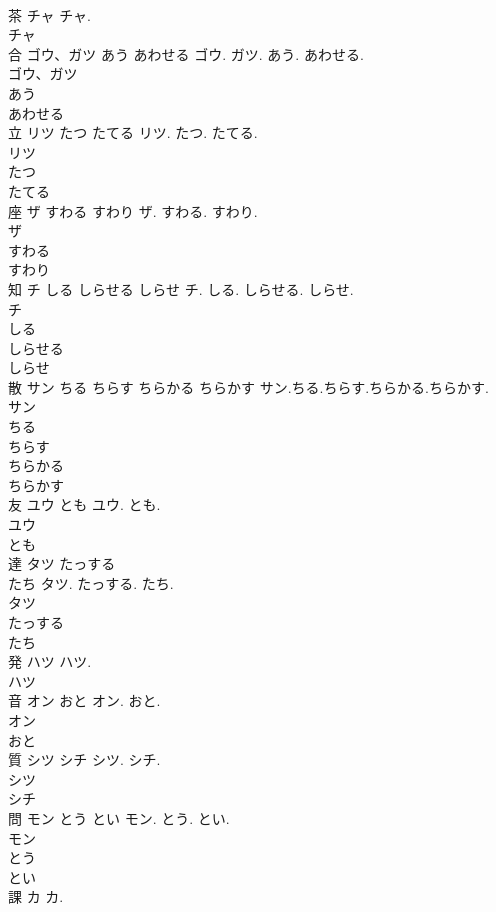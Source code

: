 \documentclass[8pt]{extreport}
\begin{document}
\begin{CJK}{UTF8}{min}
\\	茶	チャ	チャ.	
\\	チャ
\\	合	ゴウ、ガツ あう あわせる	ゴウ. ガツ. あう. あわせる.	
\\	ゴウ、ガツ
\\	あう
\\	あわせる
\\	立	リツ たつ たてる	リツ. たつ. たてる.	
\\	リツ
\\	たつ
\\	たてる
\\	座	ザ すわる すわり	ザ. すわる. すわり.	
\\	ザ
\\	すわる
\\	すわり
\\	知	チ しる しらせる しらせ	チ. しる. しらせる. しらせ.	
\\	チ
\\	しる
\\	しらせる
\\	しらせ
\\	散	サン ちる ちらす ちらかる ちらかす	サン.ちる.ちらす.ちらかる.ちらかす.	
\\	サン
\\	ちる
\\	ちらす
\\	ちらかる
\\	ちらかす
\\	友	ユウ とも	ユウ. とも.	
\\	ユウ
\\	とも
\\	達	タツ たっする 
\\	たち	タツ. たっする. たち.	
\\	タツ
\\	たっする
\\	たち
\\	発	ハツ	ハツ.	
\\	ハツ
\\	音	オン おと	オン. おと.	
\\	オン
\\	おと
\\	質	シツ シチ	シツ. シチ.	
\\	シツ
\\	シチ
\\	問	モン とう とい	モン. とう. とい.	
\\	モン
\\	とう
\\	とい 
\\	課	カ	カ.	

\end{CJK}
\end{document}
